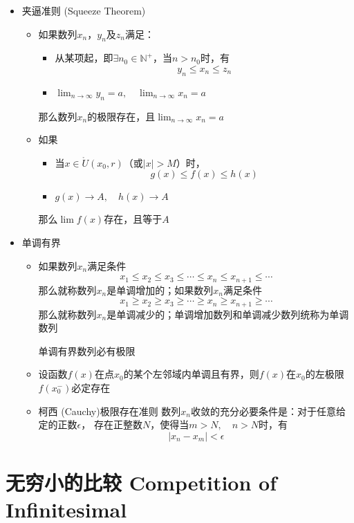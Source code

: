 \documentclass[UTF8]{ctexart}
\begin{document}
\bigskip

\begin{itemize}
  \item[] 夹逼准则 (Squeeze Theorem)
  \begin{itemize}
    \item 如果数列${x_n}$，${y_n}$及${z_n}$满足：
    \begin{itemize}
      \item 从某项起，即$\exists n_0\in\mathbb{N}^+$，当$n>n_0$时，有
      \[ y_n\le x_n \le z_n \]
      \item $\lim_{n\to\infty}y_n=a,\quad\lim_{n\to\infty}x_n=a$
    \end{itemize}
    那么数列${x_n}$的极限存在，且$\lim_{n\to\infty}x_n=a$
    \item 如果
    \begin{itemize}
      \item 当$x\in\mathring{U}(x_0,r)$（或$|x|>M$）时，
      \[ g(x)\le f(x)\le h(x) \]
      \item $g(x)\to A,\quad h(x)\to A$
    \end{itemize}
    那么$\lim f(x)$存在，且等于$A$
  \end{itemize}
  \item[] 单调有界
  \begin{itemize}
    \item 如果数列${x_n}$满足条件
    \[ x_1\le x_2 \le x_3\le \cdots \le x_n\le x_{n+1}\le\cdots \]
    那么就称数列${x_n}$是单调增加的；如果数列${x_n}$满足条件
    \[ x_1\ge x_2 \ge x_3\ge \cdots \ge x_n\ge x_{n+1}\ge\cdots \]
    那么就称数列${x_n}$是单调减少的；单调增加数列和单调减少数列统称为单调数列

    单调有界数列必有极限
    \item 设函数$f(x)$在点$x_0$的某个左邻域内单调且有界，则$f(x)$在$x_0$的左极限$f(x_0^-)$必定存在
    \item 柯西 (Cauchy)极限存在准则 数列${x_n}$收敛的充分必要条件是：对于任意给定的正数$\epsilon$，
    存在正整数$N$，使得当$m>N,\quad n>N$时，有
    \[ |x_n-x_m|<\epsilon \]
  \end{itemize}
\end{itemize}
\bigskip
\bigskip
\section*{无穷小的比较 Competition of Infinitesimal}

\bigskip
\end{document}
